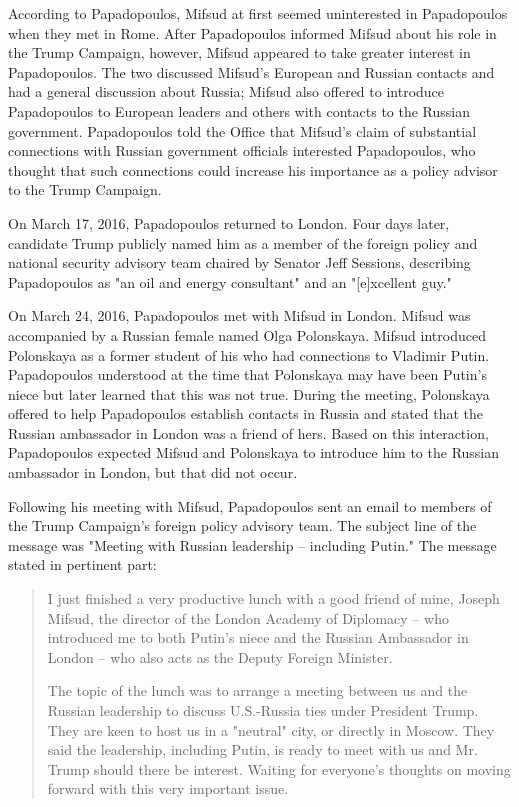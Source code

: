 According to Papadopoulos, Mifsud at first seemed uninterested in Papadopoulos when they met in Rome.%
After Papadopoulos informed Mifsud about his role in the Trump Campaign, however, Mifsud appeared to take greater interest in Papadopoulos.%
The two discussed Mifsud's European and Russian contacts and had a general discussion about Russia; Mifsud also offered to introduce Papadopoulos to European leaders and others with contacts to the Russian government.%
Papadopoulos told the Office that Mifsud's claim of substantial connections with Russian government officials interested Papadopoulos, who thought that such connections could increase his importance as a policy advisor to the Trump Campaign.%

On March 17, 2016, Papadopoulos returned to London.%
Four days later, candidate Trump publicly named him as a member of the foreign policy and national security advisory team chaired by Senator Jeff Sessions, describing Papadopoulos as "an oil and energy consultant" and an "[e]xcellent guy."%

On March 24, 2016, Papadopoulos met with Mifsud in London.%
Mifsud was accompanied by a Russian female named Olga Polonskaya.
Mifsud introduced Polonskaya as a former student of his who had connections to Vladimir Putin.%
Papadopoulos understood at the time that Polonskaya may have been Putin's niece but later learned that this was not true.%
During the meeting, Polonskaya offered to help Papadopoulos establish contacts in Russia and stated that the Russian ambassador in London was a friend of hers.%
Based on this interaction, Papadopoulos expected Mifsud and Polonskaya to introduce him to the Russian ambassador in London, but that did not occur.%

Following his meeting with Mifsud, Papadopoulos sent an email to members of the Trump Campaign's foreign policy advisory team. The subject line of the message was "Meeting with Russian leadership -- including Putin."%
The message stated in pertinent part:

\begin{quote}
I just finished a very productive lunch with a good friend of mine, Joseph Mifsud, the director of the London Academy of Diplomacy -- who introduced me to both Putin's niece and the Russian Ambassador in London -- who also acts as the Deputy Foreign Minister.%

The topic of the lunch was to arrange a meeting between us and the Russian leadership to discuss U.S.-Russia ties under President Trump.
They are keen to host us in a "neutral" city, or directly in Moscow.
They said the leadership, including Putin, is ready to meet with us and Mr. Trump should there be interest.
Waiting for everyone's thoughts on moving forward with this very important issue.%
\end{quote}

